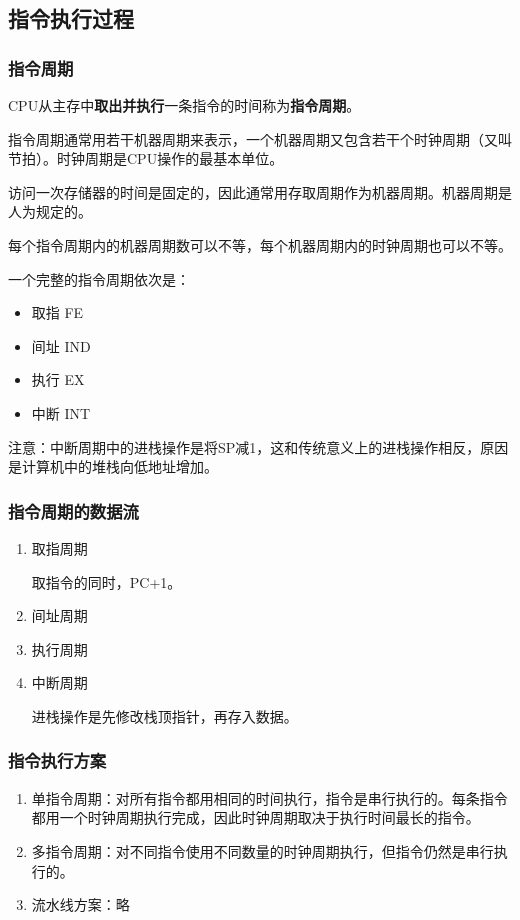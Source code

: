 \documentclass[12pt, a4paper, oneside]{ctexart}
\begin{document}
\subsection{指令执行过程}

\subsubsection{指令周期}
\label{instruction_cycle}

CPU从主存中\textbf{取出并执行}一条指令的时间称为\textbf{指令周期}。

指令周期通常用若干机器周期来表示，一个机器周期又包含若干个时钟周期（又叫节拍）。时钟周期是CPU操作的最基本单位。

访问一次存储器的时间是固定的，因此通常用存取周期作为机器周期。机器周期是人为规定的。

每个指令周期内的机器周期数可以不等，每个机器周期内的时钟周期也可以不等。

一个完整的指令周期依次是：
\begin{itemize}
  \item 取指 FE
  \item 间址 IND
  \item 执行 EX
  \item 中断 INT
\end{itemize}

注意：中断周期中的进栈操作是将SP减1，这和传统意义上的进栈操作相反，原因是计算机中的堆栈向低地址增加。

\subsubsection{指令周期的数据流}

\begin{enumerate}
  \item {\kaishu 取指周期}
  
  取指令的同时，PC+1。
  \item {\kaishu 间址周期}
  \item {\kaishu 执行周期}
  \item {\kaishu 中断周期}
  
  进栈操作是先修改栈顶指针，再存入数据。
\end{enumerate}

\subsubsection{指令执行方案}

\begin{enumerate}
  \item {\kaishu 单指令周期}：对所有指令都用相同的时间执行，指令是串行执行的。每条指令都用一个时钟周期执行完成，因此时钟周期取决于执行时间最长的指令。
  \item {\kaishu 多指令周期}：对不同指令使用不同数量的时钟周期执行，但指令仍然是串行执行的。
  \item {\kaishu 流水线方案}：略
\end{enumerate}
\end{document}
